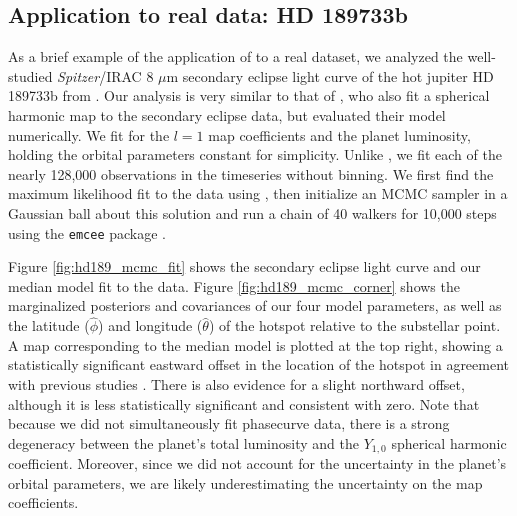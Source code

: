 \documentclass[modern]{aastex61}
\begin{document}
\subsection{Application to real data: HD 189733b}
\label{sec:hd189}

As a brief example of the application of \starry to a real dataset, we analyzed the
well-studied \textit{Spitzer}/IRAC 8 $\mu$m secondary eclipse light curve of the
hot jupiter HD 189733b from \citet{Knutson2007}.
Our analysis is very similar to that of \citet{Majeau2012}, who also fit a spherical
harmonic map to the secondary eclipse data, but evaluated their model numerically.
We fit for the $l = 1$ map coefficients
and the planet luminosity, holding the orbital parameters constant for simplicity.
Unlike \citet{Majeau2012}, we fit each of the nearly 128,000 observations in the
timeseries without binning. We first find the maximum likelihood fit to the
data using \starrygrad, then initialize an MCMC sampler in a
Gaussian ball about this solution and run a chain of 40 walkers for 10,000 steps
using the \texttt{emcee} package \citep{Foreman-Mackey2013}.

Figure \ref{fig:hd189_mcmc_fit} shows the secondary eclipse light curve and our
median model fit to the data. Figure \ref{fig:hd189_mcmc_corner}
shows the marginalized posteriors and covariances of our four model parameters, as
well as the latitude ($\hat{\phi}$) and longitude ($\hat{\theta}$) of the hotspot
relative to the substellar
point. A map corresponding to the median model is plotted at the top right,
showing a statistically significant eastward
offset in the location of the hotspot in agreement with previous studies
\citep{Knutson2007, Majeau2012, deWit2012}. There is also evidence for a slight northward offset,
although it is less statistically significant and consistent with zero.
Note that because we did not simultaneously
fit phasecurve data, there is a strong degeneracy between the planet's
total luminosity and the $Y_{1,0}$ spherical harmonic coefficient. Moreover,
since we did not account for the uncertainty in the planet's orbital parameters,
we are likely underestimating the uncertainty on the map coefficients.
\end{document}
